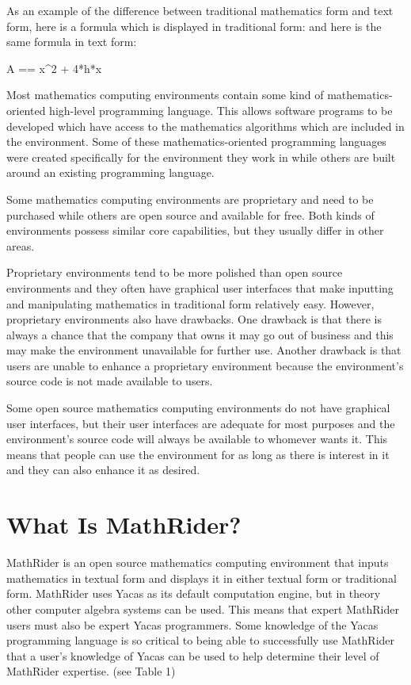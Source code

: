 \documentclass[12pt,oneside]{book}
\begin{document}
As an example of the difference between traditional mathematics form and text form, here is a formula which is displayed in traditional form: 
and here is the same formula in text form:


A == x\^{}2 + 4*h*x


Most mathematics computing environments contain some kind of mathematics{}-oriented high{}-level programming language. This allows software programs to be developed which have access to the mathematics algorithms which are included in the environment. Some of these mathematics{}-oriented programming languages were created specifically for the environment they work in while others are built around an existing programming language. 

Some mathematics computing environments are proprietary and need to be purchased while others are open source and available for free. Both kinds of environments possess similar core capabilities, but they usually differ in other areas. 

Proprietary environments tend to be more polished than open source environments and they often have graphical user interfaces that make inputting and manipulating mathematics in traditional form relatively easy. However, proprietary environments also have drawbacks. One drawback is that there is always a chance that the company that owns it may go out of business and this may make the environment unavailable for further use. Another drawback is that users are unable to enhance a proprietary environment because the environment's source code is not made available to users. 

Some open source mathematics computing environments do not have graphical user interfaces, but their user interfaces are adequate for most purposes and the environment's source code will always be available to whomever wants it. This means that people can use the environment for as long as there is interest in it and they can also enhance it as desired.

\section[What Is MathRider?]{What Is MathRider?}

MathRider is an open source mathematics computing environment that inputs mathematics in textual form and displays it in either textual form or traditional form. MathRider uses Yacas as its default computation engine, but in theory other computer algebra systems can be used. This means that expert MathRider users must also be expert Yacas programmers. Some knowledge of the Yacas programming language is so critical to being able to successfully use MathRider that a user's knowledge of Yacas can be used to help determine their level of MathRider expertise. (see Table 1) 
\end{document}

